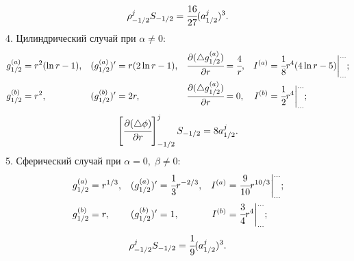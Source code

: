 $$\rho_{-1/2}^j S_{-1/2} = \cfrac{16}{27} (a_{1/2}^j)^3 {\text{.}}$$
4. Цилиндрический случай при $\alpha \neq 0$:
\begin{align*}
    g_{1/2}^{(a)} &= r^2 (\ln r - 1), & (g_{1/2}^{(a)})' &= r (2 \ln r - 1), & \cfrac{\partial (\triangle g_{1/2}^{(a)})}{\partial r} &= \cfrac{4}{r}, & I^{(a)} &= \cfrac{1}{8} r^4 (4 \ln r - 5) \bigg|_{...}^{...} {\text{;}} \\
    g_{1/2}^{(b)} &= r^2, & (g_{1/2}^{(b)})' &= 2r, & \cfrac{\partial (\triangle g_{1/2}^{(a)})}{\partial r} &= 0, & I^{(b)} &= \cfrac{1}{2} r^4 \bigg|_{...}^{...} {\text{;}}
\end{align*}
$$\left[ \cfrac{\partial (\triangle \phi)}{\partial r} \right]_{-1/2}^j S_{-1/2} = 8 a_{1/2}^j {\text{.}}$$
5. Сферический случай при $\alpha = 0, \; \beta \neq 0$:
\begin{align*}
    g_{1/2}^{(a)} &= r^{1/3}, & (g_{1/2}^{(a)})' &= \cfrac{1}{3} r^{-2/3}, & I^{(a)} &= \cfrac{9}{10} r^{10/3} \bigg|_{...}^{...}  {\text{;}} \\
    g_{1/2}^{(b)} &= r, & (g_{1/2}^{(b)})' &= 1, & I^{(b)} &= \cfrac{3}{4} r^4 \bigg|_{...}^{...} {\text{;}}
\end{align*}
$$\rho_{-1/2}^j S_{-1/2} = \cfrac{1}{9} (a_{1/2}^j)^3 {\text{.}}$$
\endgroup